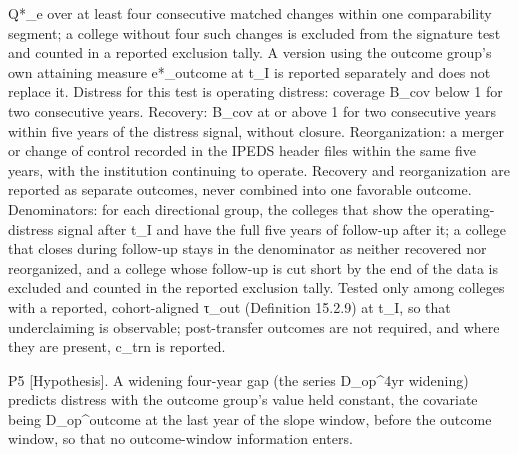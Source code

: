 \documentclass[
]{article}
\begin{document}
Q*\_e over at least four consecutive matched changes within one
comparability segment; a college without four such changes is excluded
from the signature test and counted in a reported exclusion tally. A
version using the outcome group's own attaining measure e*\_outcome at
t\_I is reported separately and does not replace it. Distress for this
test is operating distress: coverage B\_cov below 1 for two consecutive
years. Recovery: B\_cov at or above 1 for two consecutive years within
five years of the distress signal, without closure. Reorganization: a
merger or change of control recorded in the IPEDS header files within
the same five years, with the institution continuing to operate.
Recovery and reorganization are reported as separate outcomes, never
combined into one favorable outcome. Denominators: for each directional
group, the colleges that show the operating-distress signal after t\_I
and have the full five years of follow-up after it; a college that
closes during follow-up stays in the denominator as neither recovered
nor reorganized, and a college whose follow-up is cut short by the end
of the data is excluded and counted in the reported exclusion tally.
Tested only among colleges with a reported, cohort-aligned τ\_out
(Definition 15.2.9) at t\_I, so that underclaiming is observable;
post-transfer outcomes are not required, and where they are present,
c\_trn is reported.

P5 {[}Hypothesis{]}. A widening four-year gap (the series D\_op\^{}4yr
widening) predicts distress with the outcome group's value held
constant, the covariate being D\_op\^{}outcome at the last year of the
slope window, before the outcome window, so that no outcome-window
information enters.
\end{document}
